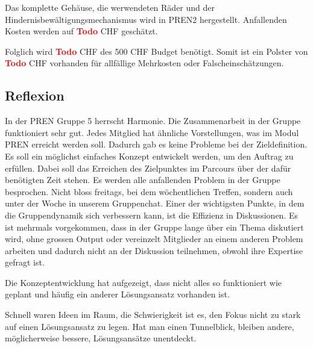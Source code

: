 \documentclass[../main.tex]{subfiles}
\begin{document}
Das komplette Gehäuse, die werwendeten Räder und der Hindernisbewältigungsmechanismus wird in PREN2 hergestellt. Anfallenden Kosten werden auf \textcolor{red}{\textbf{Todo}} CHF geschätzt.

Folglich wird \textcolor{red}{\textbf{Todo}} CHF des 500 CHF Budget benötigt. Somit ist ein Polster von \textcolor{red}{\textbf{Todo}} CHF vorhanden für allfällige Mehrkosten oder Falscheinschätzungen.

\subsection{Reflexion}

In der PREN Gruppe 5 herrscht Harmonie.
\newline
\newline
Die Zusammenarbeit in der Gruppe funktioniert sehr gut. Jedes Mitglied hat ähnliche Vorstellungen, was im Modul PREN erreicht werden soll. Dadurch gab es keine Probleme bei der Zieldefinition. Es soll ein möglichst einfaches Konzept entwickelt werden, um den Auftrag zu erfüllen. Dabei soll das Erreichen des Zielpunktes im Parcours über der dafür benötigten Zeit stehen. Es werden alle anfallenden Problem in der Gruppe besprochen. Nicht bloss freitags, bei dem wöchentlichen Treffen, sondern auch unter der Woche in unserem Gruppenchat. Einer der wichtigsten Punkte, in dem die Gruppendynamik sich verbessern kann, ist die Effizienz in Diskussionen. Es ist mehrmals vorgekommen, dass in der Gruppe lange über ein Thema diskutiert wird, ohne grossen Output oder vereinzelt Mitglieder an einem anderen Problem arbeiten und dadurch nicht an der Diskussion teilnehmen, obwohl ihre Expertise gefragt ist.

Die Konzeptentwicklung hat aufgezeigt, dass nicht alles so funktioniert wie geplant und häufig ein anderer Lösungsansatz vorhanden ist. 

Schnell waren Ideen im Raum, die Schwierigkeit ist es, den Fokus nicht zu stark auf einen Lösungsansatz zu legen. Hat man einen Tunnelblick, bleiben andere, möglicherweise bessere, Lösungsansätze unentdeckt. 
\end{document}
